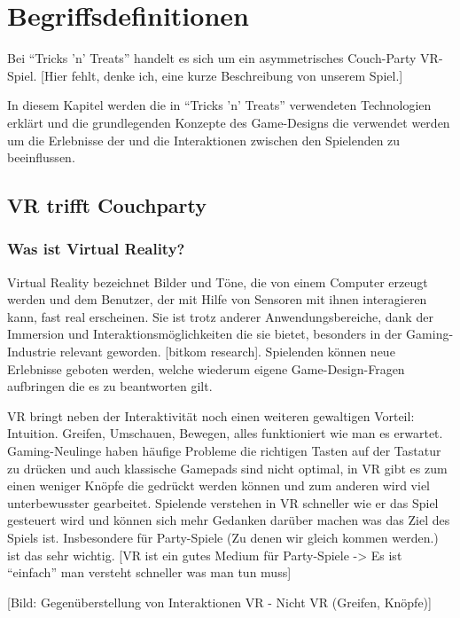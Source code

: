 \chapter{Begriffsdefinitionen}

Bei "`Tricks 'n' Treats"' handelt es sich um ein asymmetrisches Couch-Party VR-Spiel. [Hier fehlt, denke ich, eine kurze Beschreibung von unserem Spiel.]

In diesem Kapitel werden die in "`Tricks 'n' Treats"' verwendeten Technologien erklärt und die grundlegenden Konzepte des Game-Designs die verwendet werden um die  Erlebnisse der und die Interaktionen zwischen den Spielenden zu beeinflussen.

\section{VR trifft Couchparty}

\subsection{Was ist Virtual Reality?}

Virtual Reality bezeichnet Bilder und Töne, die von einem Computer erzeugt werden und dem Benutzer, der mit Hilfe von Sensoren mit ihnen interagieren kann, fast real erscheinen.\cite{_oxford_dict} Sie ist trotz anderer Anwendungsbereiche, dank der Immersion und Interaktionsmöglichkeiten die sie bietet, besonders in der Gaming-Industrie relevant geworden. [bitkom research]. Spielenden können neue Erlebnisse geboten werden, welche wiederum eigene  Game-Design-Fragen aufbringen die es zu beantworten gilt.

VR bringt neben der Interaktivität noch einen weiteren gewaltigen Vorteil: Intuition. Greifen, Umschauen, Bewegen, alles funktioniert wie man es erwartet. Gaming-Neulinge haben häufige Probleme die richtigen Tasten auf der Tastatur zu drücken und auch klassische Gamepads sind nicht optimal, in VR gibt es zum einen weniger Knöpfe die gedrückt werden können und zum anderen wird viel unterbewusster gearbeitet. Spielende verstehen in VR schneller wie er das Spiel gesteuert wird und können sich mehr Gedanken darüber machen was das Ziel des Spiels ist. Insbesondere für Party-Spiele (Zu denen wir gleich kommen werden.) ist das sehr wichtig. [VR ist ein gutes Medium für Party-Spiele -> Es ist "`einfach"' man versteht schneller was man tun muss]

[Bild: Gegenüberstellung von Interaktionen VR - Nicht VR (Greifen, Knöpfe)]

